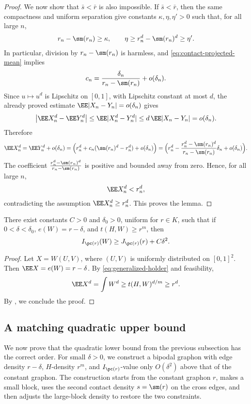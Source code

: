 \begin{proof}
We now show that $\bar s<\bar r$ is also impossible.  If $\bar s<\bar r$, then the same
compactness and uniform separation give constants $\kappa,\eta,\eta'>0$ such
that, for all large $n$,
\[
  r_n-\sm(r_n)\ge \kappa,
  \qquad
  \eta \ge r_n^d-\sm(r_n)^d\ge \eta'.
\]
In particular, division by $r_n-\sm(r_n)$ is harmless, and
\eqref{eq:contact-projected-mean} implies
\[
  c_n=\frac{\delta_n}{r_n-\sm(r_n)}+o(\delta_n).
\]
Since $u\mapsto u^d$ is Lipschitz on $[0,1]$, with Lipschitz constant at most
$d$, the already proved estimate $\EE |X_n-Y_n|=o(\delta_n)$ gives
\[
  \left|\EE X_n^d-\EE Y_n^d\right|
  \le \EE |X_n^d-Y_n^d|
  \le d\,\EE |X_n-Y_n|
  =o(\delta_n).
\]
Therefore
\begin{align*}
  \EE X_n^d
  =\EE Y_n^d+o(\delta_n)
  = \Big(r_n^d+c_n(\sm(r_n)^d-r_n^d)+o(\delta_n)\Big)
  = \Big(r_n^d-\frac{r_n^d-\sm(r_n)^d}{r_n-\sm(r_n)}\delta_n+o(\delta_n)\Big).
\end{align*}
The coefficient
$\frac{r_n^d-\sm(r_n)^d}{r_n-\sm(r_n)}$
is positive and bounded away from zero.  Hence, for all large $n$,
\[
  \EE X_n^d<r_n^d,
\]
contradicting the assumption $\EE X_n^d\ge r_n^d$.  This proves
the lemma.
\end{proof}

\begin{proposition}\label{prop:graphon-quadratic-bound}
There exist constants $C>0$ and $\delta_0>0$, uniform for $r\in K$, such that
if $0<\delta<\delta_0$, $e(W)=r-\delta$, and $t(H,W)\ge r^m$, then
\begin{equation}\label{eq:graphon-quadratic-bound}
  I_{\pc(r)}(W)
  \ge
  J_{\pc(r)}(r)+C\delta^2.
\end{equation}
\end{proposition}

\begin{proof}
Let $X=W(U,V)$, where $(U,V)$ is uniformly distributed on $[0,1]^2$.  Then
$\EE X=e(W)=r-\delta$.  By \eqref{eq:generalized-holder} and feasibility,
\[
  \EE X^d=\int W^d\ge t(H,W)^{d/m} \ge r^d.
\]
By , we conclude the proof.
\end{proof}

\subsection{A matching quadratic upper bound}

We now prove that the quadratic lower bound from the previous subsection has
the correct order.  For small $\delta>0$, we construct a bipodal graphon with
edge density $r-\delta$, $H$-density $r^m$, and $I_{\pc(r)}$-value only
$O(\delta^2)$ above that of the constant graphon.  The construction starts
from the constant graphon $r$, makes a small block, uses the second contact density
$s=\sm(r)$ on the cross edges, and then adjusts the large-block density to
restore the two constraints.

